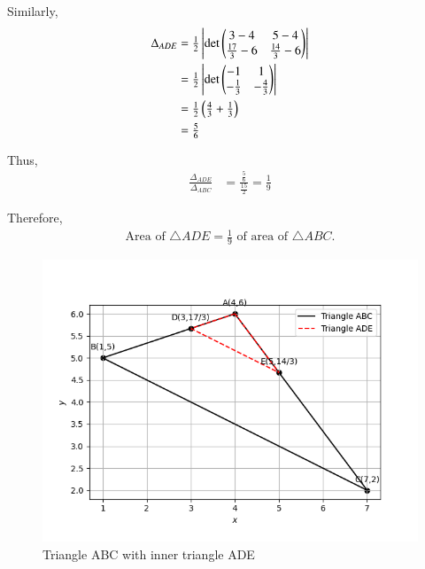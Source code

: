 \documentclass[journal]{IEEEtran}
\begin{document}
Similarly,
\begin{align}
    \Delta_{ADE} &= \tfrac{1}{2}\left|\det \begin{pmatrix}3-4 & 5-4 \\ \tfrac{17}{3}-6 & \tfrac{14}{3}-6\end{pmatrix}\right| \\
                 &= \tfrac{1}{2}\left|\det \begin{pmatrix}-1 & 1 \\ -\tfrac{1}{3} & -\tfrac{4}{3}\end{pmatrix}\right| \\
                 &= \tfrac{1}{2}\left(\tfrac{4}{3}+\tfrac{1}{3}\right) \\
                 &= \tfrac{5}{6}
\end{align}

Thus,
\begin{align}
    \frac{\Delta_{ADE}}{\Delta_{ABC}}
    &= \frac{\tfrac{5}{6}}{\tfrac{15}{2}}
     = \frac{1}{9}
\end{align}

Therefore,
\begin{align}
    \text{Area of } \triangle ADE = \tfrac{1}{9} \text{ of area of } \triangle ABC.
\end{align}

\begin{figure}[H]
    \centering
    \includegraphics[width=0.6\linewidth]{figs/fig4.png}
    \caption{Triangle ABC with inner triangle ADE}
    \label{fig:1}
\end{figure}
\end{document}
